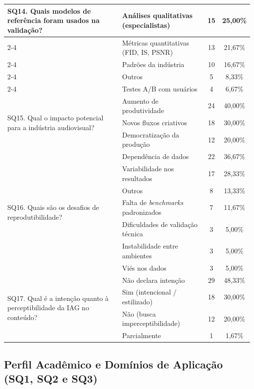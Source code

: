 \begin{longtable}{|p{4.2cm}|p{5.2cm}|c|c|}
\multirow{5}{=}{SQ14. Quais modelos de referência foram usados na validação?}
& Análises qualitativas (especialistas) & 15 & 25,00\% \\ \cline{2-4}
& Métricas quantitativas (FID, IS, PSNR) & 13 & 21,67\% \\ \cline{2-4}
& Padrões da indústria & 10 & 16,67\% \\ \cline{2-4}
& Outros & 5 & 8,33\% \\ \cline{2-4}
& Testes A/B com usuários & 4 & 6,67\% \\
\hline

\multirow{3}{=}{SQ15. Qual o impacto potencial para a indústria audiovisual?}
& Aumento de produtividade & 24 & 40,00\% \\ \cline{2-4}
& Novos fluxos criativos & 18 & 30,00\% \\ \cline{2-4}
& Democratização da produção & 12 & 20,00\% \\
\hline

\multirow{7}{=}{SQ16. Quais são os desafios de reprodutibilidade?}
& Dependência de dados & 22 & 36,67\% \\ \cline{2-4}
& Variabilidade nos resultados & 17 & 28,33\% \\ \cline{2-4}
& Outros & 8 & 13,33\% \\ \cline{2-4}
& Falta de \textit{benchmarks} padronizados & 7 & 11,67\% \\ \cline{2-4}
& Dificuldades de validação técnica & 3 & 5,00\% \\ \cline{2-4}
& Instabilidade entre ambientes & 3 & 5,00\% \\ \cline{2-4}
& Viés nos dados & 3 & 5,00\% \\
\hline

\multirow{4}{=}{SQ17. Qual é a intenção quanto à perceptibilidade da IAG no conteúdo?}
& Não declara intenção & 29 & 48,33\% \\ \cline{2-4}
& Sim (intencional / estilizado) & 18 & 30,00\% \\ \cline{2-4}
& Não (busca imperceptibilidade) & 12 & 20,00\% \\ \cline{2-4}
& Parcialmente & 1 & 1,67\% \\
\hline
\end{longtable}
\normalsize

\subsection{Perfil Acadêmico e Domínios de Aplicação (SQ1, SQ2 e SQ3)}

